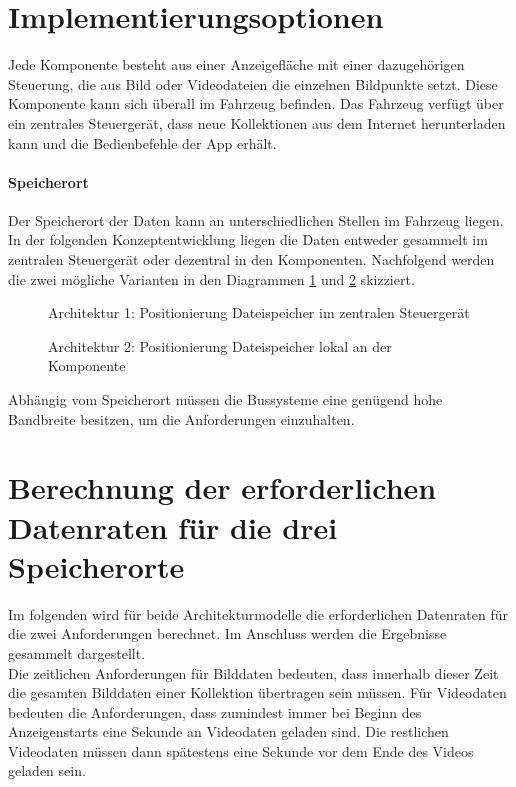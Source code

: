 \section{Implementierungsoptionen}
Jede Komponente besteht aus einer Anzeigefläche mit einer dazugehörigen Steuerung, die aus Bild oder Videodateien die einzelnen Bildpunkte setzt. Diese Komponente kann sich überall im Fahrzeug befinden.
Das Fahrzeug verfügt über ein zentrales Steuergerät, dass neue Kollektionen aus dem Internet herunterladen kann und die Bedienbefehle der App erhält.
\paragraph{Speicherort}
Der Speicherort der Daten kann an unterschiedlichen Stellen im Fahrzeug liegen. In der folgenden Konzeptentwicklung liegen die Daten entweder gesammelt im zentralen Steuergerät oder dezentral in den Komponenten. 
Nachfolgend werden die zwei mögliche Varianten in den Diagrammen \ref{fig:architektur1} und \ref{fig:architektur2} skizziert.
\begin{figure}[]
	\centering
	
	\caption[Architektur 1: Positionierung Dateispeicher im zentralen Steuergerät]{Architektur 1: Positionierung Dateispeicher im zentralen Steuergerät}
	\label{fig:architektur1}
\end{figure}
\begin{figure}[]
	\centering
	
	\caption[Architektur 2: Positionierung Dateispeicher lokal an der Komponente]{Architektur 2: Positionierung Dateispeicher lokal an der Komponente}
	\label{fig:architektur2}
\end{figure}
Abhängig vom Speicherort müssen die Bussysteme eine genügend hohe Bandbreite besitzen, um die Anforderungen einzuhalten. 
\section{Berechnung der erforderlichen Datenraten für die drei Speicherorte}
Im folgenden wird für beide Architekturmodelle die erforderlichen Datenraten für die zwei Anforderungen berechnet. Im Anschluss werden die Ergebnisse gesammelt dargestellt. \\
Die zeitlichen Anforderungen für Bilddaten bedeuten, dass innerhalb dieser Zeit die gesamten Bilddaten einer Kollektion übertragen sein müssen. 
Für Videodaten bedeuten die Anforderungen, dass zumindest immer bei Beginn des Anzeigenstarts eine Sekunde an Videodaten geladen sind. Die restlichen Videodaten müssen dann spätestens eine Sekunde vor dem Ende des Videos geladen sein. 
